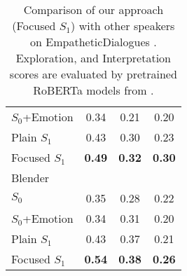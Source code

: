 \documentclass[11pt]{article}
\begin{document}
{\begin{table}[t]
\begin{center}
\begin{tabular}{lccc}
        \hspace{1mm}$S_0$+Emotion        & 0.34                      & 0.21                                     & 0.20                                 \\
        \cmidrule(l{0.5em}){1-1}
        \hspace{1mm}Plain $S_1$          & 0.43                      & 0.30                                     & 0.23                                 \\
        \hspace{1mm}Focused $S_1$        & \textbf{0.49}             & \textbf{0.32}                            & \textbf{0.30}                                 \\
\midrule
        \multicolumn{4}{l}{Blender \cite{Roller:2021:EACL}} \\
\addlinespace[0.1cm]
        \hspace{1mm}$S_0$                & 0.35                      & 0.28                                     & 0.22                                 \\
        \hspace{1mm}$S_0$+Emotion        & 0.34                      & 0.31                                     & 0.20                                 \\
        \cmidrule(l{0.5em}){1-1}
        \hspace{1mm}Plain $S_1$          & 0.43                      & 0.37                                     & 0.21                                 \\
        \hspace{1mm}Focused $S_1$        & \textbf{0.54}             & \textbf{0.38}                            & \textbf{0.26}                                 \\
\bottomrule
    \end{tabular}
\vspace{-5pt}
    \caption{
        Comparison of our approach (Focused $S_1$) with other speakers on EmpatheticDialogues \cite{Rashkin:2019:ACL}.
        Exploration, and Interpretation scores are evaluated by pretrained RoBERTa models from \citet{Sharma:2020:EMNLP}.
    }
    \vspace{-10pt}
    \label{tab:ed_results}
\end{center}\end{table}}
\end{document}
